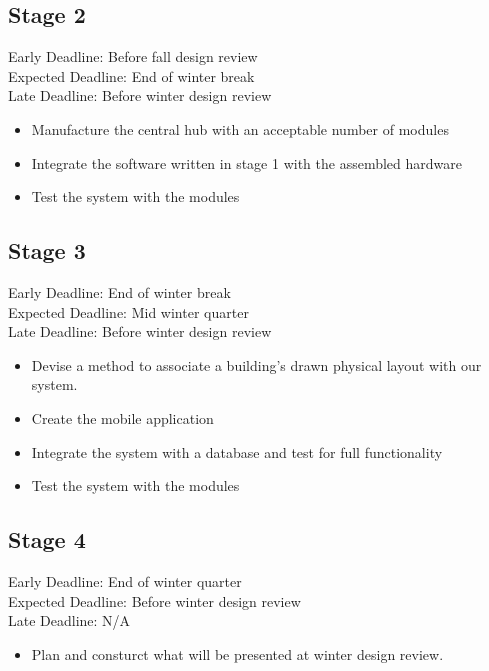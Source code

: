 \documentclass{article}
\begin{document}
\subsection{Stage 2}
Early Deadline: Before fall design review \\
Expected Deadline: End of winter break \\
Late Deadline: Before winter design review \\
\begin{itemize}
\item Manufacture the central hub with an acceptable number of modules \\
\item Integrate the software written in stage 1 with the assembled hardware \\
\item Test the system with the modules
\end{itemize}

\subsection{Stage 3}
Early Deadline: End of winter break \\
Expected Deadline: Mid winter quarter \\
Late Deadline: Before winter design review \\
\begin{itemize}
\item Devise a method to associate a building's drawn physical layout with our system. \\
\item Create the mobile application \\
\item Integrate the system with a database and test for full functionality \\
\item Test the system with the modules
\end{itemize}

\subsection{Stage 4}
Early Deadline: End of winter quarter \\
Expected Deadline: Before winter design review \\
Late Deadline: N/A \\
\begin{itemize}
\item Plan and consturct what will be presented at winter design review. \\
\end{itemize}
\end{document}
